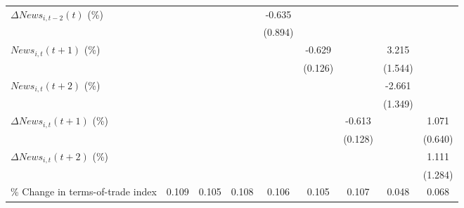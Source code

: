 {\begin{tabular}{l*{8}{c}}
\addlinespace
$ \Delta News_{i,t-2}(t)$ (\%)&                     &                     &                     &      -0.635         &                     &                     &                     &                     \\
                    &                     &                     &                     &     (0.894)         &                     &                     &                     &                     \\
\addlinespace
$ News_{i,t}(t+1)$ (\%)&                     &                     &                     &                     &      -0.629\sym{***}&                     &       3.215\sym{**} &                     \\
                    &                     &                     &                     &                     &     (0.126)         &                     &     (1.544)         &                     \\
\addlinespace
$ News_{i,t}(t+2)$ (\%)&                     &                     &                     &                     &                     &                     &      -2.661\sym{**} &                     \\
                    &                     &                     &                     &                     &                     &                     &     (1.349)         &                     \\
\addlinespace
$ \Delta News_{i,t}(t+1)$ (\%)&                     &                     &                     &                     &                     &      -0.613\sym{***}&                     &       1.071\sym{*}  \\
                    &                     &                     &                     &                     &                     &     (0.128)         &                     &     (0.640)         \\
\addlinespace
$ \Delta News_{i,t}(t+2)$ (\%)&                     &                     &                     &                     &                     &                     &                     &       1.111         \\
                    &                     &                     &                     &                     &                     &                     &                     &     (1.284)         \\
\addlinespace
\% Change in terms-of-trade index&       0.109\sym{**} &       0.105\sym{**} &       0.108\sym{**} &       0.106\sym{**} &       0.105\sym{**} &       0.107\sym{*}  &       0.048         &       0.068\sym{*}  \\

\end{tabular}}
